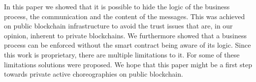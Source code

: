 \documentclass[runningheads]{llncs}
\begin{document}
In this paper we showed that it is possible to hide the logic of the business process, the communication and the content of the messages. This was achieved on public blockchain infrastructure to avoid the trust issues that are, in our opinion, inherent to private blockchains. We furthermore showed that a business process can be enforced without the smart contract being aware of its logic. Since this work is proprietary, there are multiple limitations to it. For some of these limitations solutions were proposed. We hope that this paper might be a first step towards private active choreographies on public blockchain.





\end{document}
